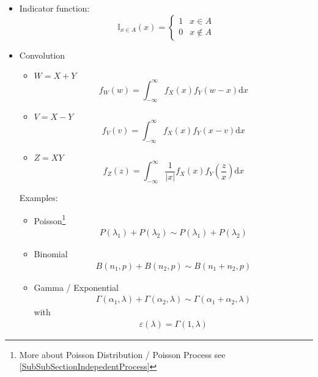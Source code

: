 \begin{itemize}
        
        \item Indicator function:
        \begin{equation}    
            \mathbb{I}_{x\in A}(x)=\begin{cases}
                1& x\in  A\\
                0& x\notin A
            \end{cases}
        \end{equation}
        \item Convolution
        \begin{itemize}
            \item $W=X+Y$
            \begin{equation}        
                f_W(w)=\int_{-\infty}^\infty f_X(x)f_Y(w-x)\mathrm{d}x    
            \end{equation}
            \item $V=X-Y$
            \begin{equation}        
                f_V(v)=\int_{-\infty}^\infty f_X(x)f_Y(x-v)\mathrm{d}x    
            \end{equation}
            \item $Z=XY$
            \begin{equation}        
                f_Z(z)=\int_{-\infty}^\infty \frac{1}{|x|}f_X(x)f_Y(\frac{z}{x})\mathrm{d}x
            \end{equation}
        \end{itemize}

            Examples:        
        \begin{itemize}[topsep=2pt,itemsep=0pt]
            \item Poisson\footnote{More about Poisson Distribution / Poisson Process see \autoref{SubSubSectionIndepedentProcess}}
            \begin{align}
                P(\lambda _1)+P(\lambda _2)\sim P(\lambda _1)+P(\lambda _2) 
            \end{align}
            \item Binomial
            \begin{align}
                B(n_1,p)+B(n_2,p)\sim B(n_1+n_2,p) 
            \end{align}
            \item Gamma / Exponential
            \begin{align}
                \Gamma (\alpha _1,\lambda )+\Gamma (\alpha _2,\lambda )\sim \Gamma (\alpha _1+\alpha _2,\lambda ) 
            \end{align}
            with 
            \begin{align}
                \varepsilon (\lambda )=\Gamma (1,\lambda ) 
            \end{align}
            

\end{itemize}
\end{itemize}
